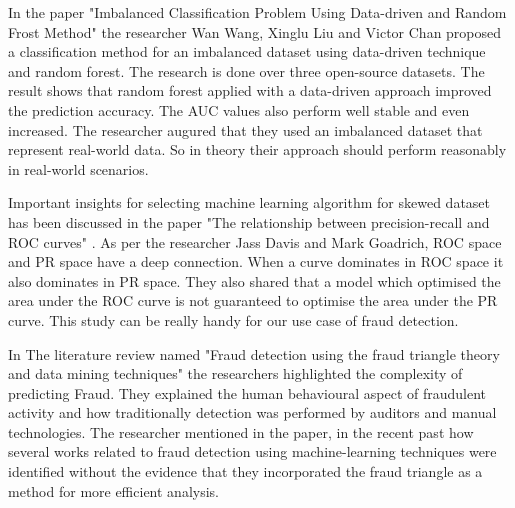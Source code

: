 In the paper "Imbalanced Classification Problem Using Data-driven and Random Frost Method" \cite{10.1145/3414274.3414278} the researcher Wan Wang, Xinglu Liu and Victor Chan proposed a classification method for an imbalanced dataset using data-driven technique and random forest. The research is done over three open-source datasets. The result shows that random forest applied with a data-driven approach improved the prediction accuracy. The AUC values also perform well stable and even increased. The researcher augured that they used an imbalanced dataset that represent real-world data. So in theory their approach should perform reasonably in real-world scenarios. 



Important insights for selecting machine learning algorithm for skewed dataset has been discussed in the paper "The relationship between precision-recall and ROC curves" \cite{davis06}. As per the researcher Jass Davis and Mark Goadrich, ROC space and PR space have a deep connection. When a curve dominates in ROC space it also dominates in PR space. They also shared that a model which optimised the area under the ROC curve is not guaranteed to optimise the area under the PR curve. This study can be really handy for our use case of fraud detection. 


In The literature review named "Fraud detection using the fraud triangle theory and data mining techniques" \cite{computers10100121} the researchers highlighted the complexity of predicting Fraud. They explained the human behavioural aspect of fraudulent activity and how traditionally detection was performed by auditors and manual technologies. The researcher mentioned in the paper, in the recent past how several works related to fraud detection using machine-learning techniques were identified without the evidence that they incorporated the fraud triangle as a method for more efficient analysis.